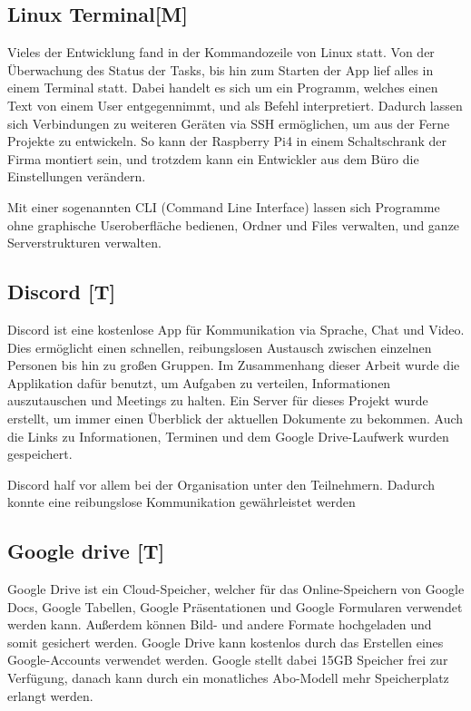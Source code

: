 \subsection{Linux Terminal[M]} 
Vieles der Entwicklung fand in der Kommandozeile von Linux statt. Von der Überwachung des Status der Tasks, bis hin zum Starten der App lief alles in einem Terminal statt. Dabei handelt es sich um ein Programm, welches einen Text von einem User entgegennimmt, und als Befehl interpretiert. Dadurch lassen sich Verbindungen zu weiteren Geräten via SSH ermöglichen, um aus der Ferne Projekte zu entwickeln. So kann der Raspberry Pi4 in einem Schaltschrank der Firma montiert sein, und trotzdem kann ein Entwickler aus dem Büro die Einstellungen verändern.   

Mit einer sogenannten CLI (Command Line Interface) lassen sich Programme ohne graphische Useroberfläche bedienen, Ordner und Files verwalten, und ganze Serverstrukturen verwalten. 
\subsection{Discord [T]} 
Discord ist eine kostenlose App für Kommunikation via Sprache, Chat und Video. Dies ermöglicht einen schnellen, reibungslosen Austausch zwischen einzelnen Personen bis hin zu großen Gruppen. Im Zusammenhang dieser Arbeit wurde die Applikation dafür benutzt, um Aufgaben zu verteilen, Informationen auszutauschen und Meetings zu halten. Ein Server für dieses Projekt wurde erstellt, um immer einen Überblick der aktuellen Dokumente zu bekommen. Auch die Links zu Informationen, Terminen und dem Google Drive-Laufwerk wurden gespeichert.   

Discord half vor allem bei der Organisation unter den Teilnehmern. Dadurch konnte eine reibungslose Kommunikation gewährleistet werden  
\subsection{Google drive [T]} 

Google Drive ist ein Cloud-Speicher, welcher für das Online-Speichern von Google Docs, Google Tabellen, Google Präsentationen und Google Formularen verwendet werden kann. Außerdem können Bild- und andere Formate hochgeladen und somit gesichert werden. Google Drive kann kostenlos durch das Erstellen eines Google-Accounts verwendet werden. Google stellt dabei 15GB Speicher frei zur Verfügung, danach kann durch ein monatliches Abo-Modell mehr Speicherplatz erlangt werden. \cite{OneDriveOfficialSite}
